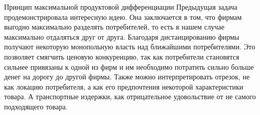 \begin{mybox}{Принцип максимальной продуктовой дифференциации}
    Предыдущая задача продемонстрировала интересную идею. Она заключается в том, что фирмам выгодно максимально
    разделять потребителей, то есть в нашем случае максимально отдаляться друг от друга. Благодаря дистанцированию
    фирмы получают некоторую монопольную власть над ближайшими потребителями. Это позволяет смягчить ценовую
    конкуренцию, так как потребители становятся сильнее привязаны к одной из фирм и им необходимо потратить сильно
    больше денег на дорогу до другой фирмы. Также можно интерпретировать отрезок, не как локацию потребителя, а как
    его предпочтения некоторой характеристики товара. А транспортные издержки, как отрицательное удовольствие от не
    самого подходящего товара.
\end{mybox}

